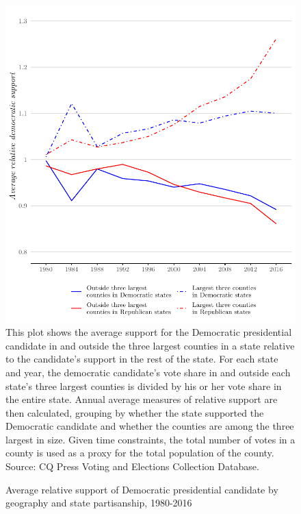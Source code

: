 \documentclass[12pt]{article}
\begin{document}
\begin{figure}[ht]
\caption{Average relative support of Democratic presidential candidate by geography and state partisanship, 1980-2016}
\centering
\includegraphics[width=.75\textwidth]{plots/county_support}
\newline\scriptsize{This plot shows the average support for the Democratic presidential candidate in and outside the three largest counties in a state relative to the candidate's support in the rest of the state. For each state and year, the democratic candidate's vote share in and outside each state's three largest counties is divided by his or her vote share in the entire state. Annual average measures of relative support are then calculated, grouping by whether the state supported the Democratic candidate and whether the counties are among the three largest in size. Given time constraints, the total number of votes in a county is used as a proxy for the total population of the county. Source: CQ Press Voting and Elections Collection Database.}
\end{figure}







\newpage
\printbibliography
 
\end{document}
